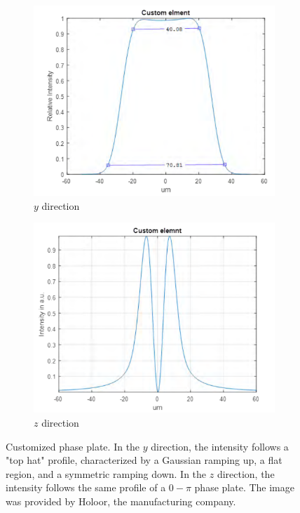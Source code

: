 \begin{figure}
    \begin{subfigure}{0.5\textwidth}
        \centering
        \includegraphics[width=\textwidth]{chapters/chapter_2/figures/tophatx.png}
        \caption{$y$ direction}
        \label{fig:tophaty}
    \end{subfigure}
    \begin{subfigure}{0.5\textwidth}
        \centering
        \includegraphics[width=\textwidth]{chapters/chapter_2/figures/tophaty.png}
        \caption{$z$ direction}
        \label{fig:tophatz}
    \end{subfigure}
    \caption{Customized phase plate. In the $y$ direction, the intensity follows a "top hat" profile, characterized by a Gaussian ramping up, a flat region, and a symmetric ramping down. In the $z$ direction, the intensity follows the same profile of a $0-\pi$ phase plate. The image was provided by Holoor, the manufacturing company.}
    \label{fig:tophat}
\end{figure}
